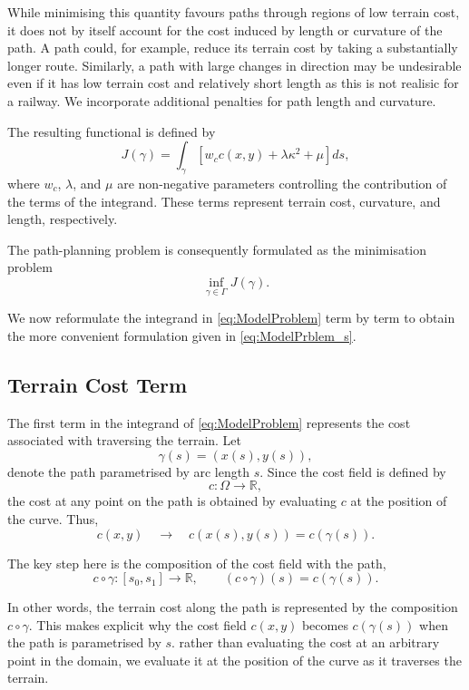 While minimising this quantity favours paths through regions of low
terrain cost, it does not by itself account for the cost induced by length or curvature
of the path. A path could, for example, reduce its terrain
cost by taking a substantially longer route. Similarly, a path with
large changes in direction may be undesirable even if it has low
terrain cost and relatively short length as this is not realisic for a railway. We incorporate
additional penalties for path length and curvature.

The resulting functional is defined by
\begin{equation}
\boxed{
J(\gamma) = 
\int_\gamma
\left[
w_cc(x,y)
+
\lambda\kappa^2
+
\mu
\right] ds,
}
\label{eq:ModelProblem}
\end{equation}
where $w_c$, $\lambda$, and $\mu$ are non-negative parameters controlling
the contribution of the terms of the integrand. These terms represent terrain cost, curvature, and length,
respectively.

The path-planning problem is consequently formulated as the
minimisation problem
\begin{equation}
\inf_{\gamma\in\Gamma}J(\gamma).
\label{eq:extended_problem}
\end{equation}

We now reformulate the integrand in \eqref{eq:ModelProblem} term by term to obtain the more convenient formulation given in \eqref{eq:ModelPrblem_s}.


\subsection{Terrain Cost Term}
\label{subsec:Terrain_term}

The first term in the integrand of \eqref{eq:ModelProblem} represents
the cost associated with traversing the terrain. Let
$$
\gamma(s)=(x(s),y(s)),
$$
denote the path parametrised by arc length $s$. Since the cost field is
defined by
$$
c:\Omega\rightarrow\mathbb{R},
$$
the cost at any point on the path is obtained by evaluating $c$ at the
position of the curve. Thus,
$$
c(x,y)
\quad\longrightarrow\quad
c(x(s),y(s))
=
c(\gamma(s)).
$$

The key step here is the composition of the cost field
with the path,
$$
c\circ\gamma:[s_0,s_1]\rightarrow\mathbb{R},
\qquad
(c\circ\gamma)(s)=c(\gamma(s)).
$$

In other words, the terrain cost along the path is represented by the
composition $c\circ\gamma$. This makes explicit why the cost field
$c(x,y)$ becomes $c(\gamma(s))$ when the path is parametrised by $s$.
rather than evaluating the cost at an arbitrary point in the domain,
we evaluate it at the position of the curve as it traverses the
terrain.

